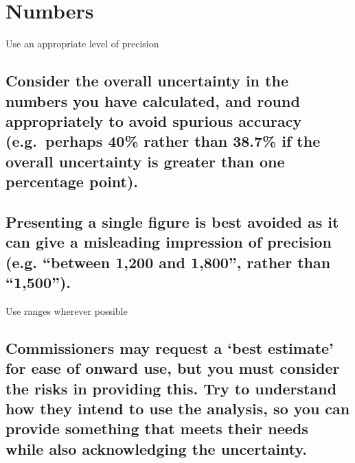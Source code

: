 \documentclass[]{book}
\begin{document}
\section{Numbers}\label{numbers}

 Use an appropriate level of precision

\subsection{Consider the overall uncertainty in the numbers you have
calculated, and round appropriately to avoid spurious accuracy
(e.g.~perhaps 40\% rather than 38.7\% if the overall uncertainty is
greater than one percentage
point).}\label{consider-the-overall-uncertainty-in-the-numbers-you-have-calculated-and-round-appropriately-to-avoid-spurious-accuracy-e.g.perhaps-40-rather-than-38.7-if-the-overall-uncertainty-is-greater-than-one-percentage-point.}

\subsection{\texorpdfstring{Presenting a single figure is best avoided
as it can give a misleading impression of precision (e.g. ``between
1,200 and 1,800'', rather than
``1,500'').}{Presenting a single figure is best avoided as it can give a misleading impression of precision (e.g. between 1,200 and 1,800, rather than 1,500).}}\label{presenting-a-single-figure-is-best-avoided-as-it-can-give-a-misleading-impression-of-precision-e.g.-between-1200-and-1800-rather-than-1500.}

 Use ranges wherever possible

\subsection{\texorpdfstring{Commissioners may request a `best estimate'
for ease of onward use, but you must consider the risks in providing
this. Try to understand how they intend to use the analysis, so you can
provide something that meets their needs while also acknowledging the
uncertainty.}{Commissioners may request a best estimate for ease of onward use, but you must consider the risks in providing this. Try to understand how they intend to use the analysis, so you can provide something that meets their needs while also acknowledging the uncertainty.}}\label{commissioners-may-request-a-best-estimate-for-ease-of-onward-use-but-you-must-consider-the-risks-in-providing-this.-try-to-understand-how-they-intend-to-use-the-analysis-so-you-can-provide-something-that-meets-their-needs-while-also-acknowledging-the-uncertainty.}
\end{document}
